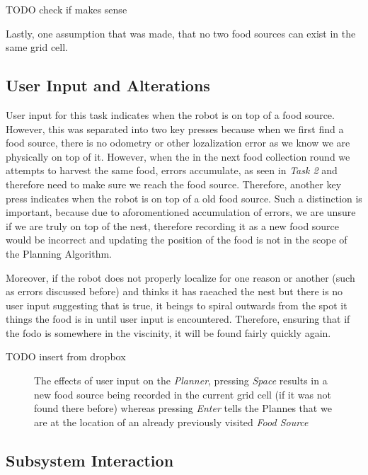 \documentclass[11pt, a4paper]{article}
\begin{document}
TODO check if makes sense

Lastly, one assumption that was made, that no two food sources can exist in the same grid cell.

\subsection{User Input and Alterations}

User input for this task indicates when the robot is on top of a food source. However, this was separated into two key presses because when we first find a food source, there is no odometry or other lozalization error as we know we are physically on top of it. However, when the in the next food collection round we attempts to harvest the same food, errors accumulate, as seen in \textit{Task 2}\cite{task2_report} and therefore need to make sure we reach the food source. Therefore, another key press indicates when the robot is on top of a old food source. Such a distinction is important, because due to aforomentioned accumulation of errors, we are unsure if we are truly on top of the nest, therefore recording it as a new food source would be incorrect and updating the position of the food is not in the scope of the Planning Algorithm. 

Moreover, if the robot does not properly localize for one reason or another (such as errors discussed before) and thinks it has raeached the nest but there is no user input suggesting that is true, it beings to spiral outwards from the spot it things the food is in until user input is encountered. Therefore, ensuring that if the fodo is somewhere in the viscinity, it will be found fairly quickly again. 


TODO insert from dropbox 

\begin{figure}
	  \caption{The effects of user input on the \textit{Planner}, pressing \textit{Space} results in a new food source being 
		recorded in the current grid cell (if it was not found there before) whereas pressing \textit{Enter} tells the Plannes
		 that we are at the location of an already previously visited \textit{Food Source}}
\end{figure} 



\subsection{Subsystem Interaction}
\end{document}
